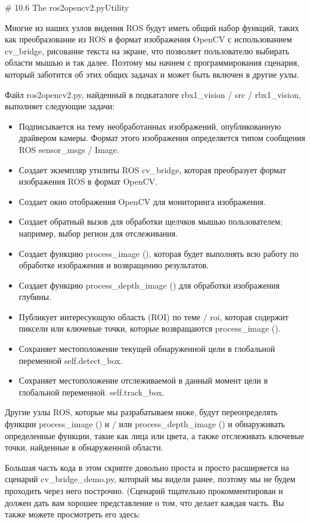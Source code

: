 # 10.6 The ros2opencv2.pyUtility


Многие из наших узлов видения ROS будут иметь общий набор функций, таких как преобразование из ROS в формат изображения OpenCV с использованием cv\_bridge, рисование текста на экране, что позволяет пользователю выбирать области мышью и так далее. Поэтому мы начнем с программирования сценария, который заботится об этих общих задачах и может быть включен в другие узлы.

Файл ros2opencv2.py, найденный в подкаталоге rbx1\_vision / src / rbx1\_vision, выполняет следующие задачи:

\begin{itemize} 
\item { Подписывается на тему необработанных изображений, опубликованную драйвером камеры. Формат этого изображения определяется типом сообщения ROS sensor\_msgs / Image. } 
\item { Создает экземпляр утилиты ROS cv\_bridge, которая преобразует формат изображения ROS в формат OpenCV. } 
\item { Создает окно отображения OpenCV для мониторинга изображения. } 
\item { Создает обратный вызов для обработки щелчков мышью пользователем; например, выбор регион для отслеживания. } 
\item { Создает функцию process\_image (), которая будет выполнять всю работу по обработке изображения и возвращению результатов. } 
\item {  Создает функцию process\_depth\_image () для обработки изображения глубины. } 
\item { Публикует интересующую область (ROI) по теме / roi, которая содержит пиксели или ключевые точки, которые возвращаются process\_image (). } 
\item { Сохраняет местоположение текущей обнаруженной цели в глобальной переменной self.detect\_box. } 
\item { Сохраняет местоположение отслеживаемой в данный момент цели в глобальной переменной. self.track\_box.} 
\end{itemize} 

Другие узлы ROS, которые мы разрабатываем ниже, будут переопределять функции process\_image () и / или process\_depth\_image () и обнаруживать определенные функции, такие как лица или цвета, а также отслеживать ключевые точки, найденные в обнаруженной области.

Большая часть кода в этом скрипте довольно проста и просто расширяется на сценарий cv\_bridge\_demo.py, который мы видели ранее, поэтому мы не будем проходить через него построчно. (Сценарий тщательно прокомментирован и должен дать вам хорошее представление о том, что делает каждая часть. Вы также можете просмотреть его здесь:

